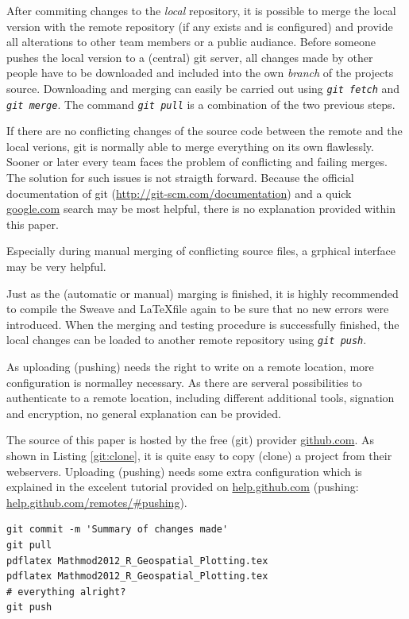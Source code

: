 \documentclass{ifacconf}
\begin{document}
After commiting changes to the \textit{local} repository, it is possible to merge the local version 
with the remote repository (if any exists and is configured) and provide all alterations to other team members or a
public audiance. Before someone pushes the local version to a (central) git server, all changes made
by other people have to be downloaded and included into the own \textit{branch} of the projects source.
Downloading and merging can easily be carried out using \textit{\lstinline!git fetch!} and 
\textit{\lstinline!git merge!}. The command \textit{\lstinline!git pull!} is a combination of
the two previous steps.

If there are no conflicting changes of the source code between the remote and the local
verions, git is normally able to merge everything on its own flawlessly. Sooner or later every team
faces the problem of conflicting and failing merges. The solution for such issues is not straigth forward.
Because the official documentation of git (\url{http://git-scm.com/documentation}) and a quick 
\url{google.com} search may be most helpful, there is no explanation provided within this paper.

Especially during manual merging of conflicting source files, a grphical interface may be very helpful.

Just as the (automatic or manual) marging is finished, it is highly recommended to compile 
the Sweave and \LaTeX file again to be sure that no new errors were introduced. When the merging and
testing procedure is successfully finished, the local changes can be loaded to another remote repository
using \textit{\lstinline!git push!}.

As uploading (pushing) needs the right to write on a remote location, more configuration is normalley 
necessary. As there are serveral possibilities to authenticate to a remote location, 
including different additional tools, signation and encryption, no general explanation can be provided.

The source of this paper is hosted by the free (git) provider \url{github.com}. As shown in 
Listing \ref{git:clone}, it is quite easy to copy (clone) a project from their webservers. 
Uploading (pushing) needs some extra configuration which is explained in the excelent tutorial
provided on \url{help.github.com} (pushing: \url{help.github.com/remotes/#pushing}).

\begin{lstlisting}
git commit -m 'Summary of changes made'
git pull
pdflatex Mathmod2012_R_Geospatial_Plotting.tex
pdflatex Mathmod2012_R_Geospatial_Plotting.tex
# everything alright?
git push
\end{lstlisting}
\end{document}
